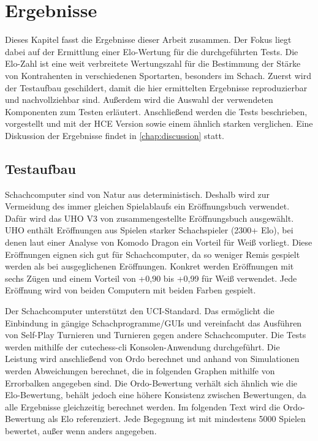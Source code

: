 \chapter{Ergebnisse}
\label{chap:Ergebnisse}

Dieses Kapitel fasst die Ergebnisse dieser Arbeit zusammen. Der Fokus liegt dabei auf der Ermittlung einer Elo-Wertung für die durchgeführten Tests. Die Elo-Zahl ist eine weit verbreitete Wertungszahl für die Bestimmung der Stärke von Kontrahenten in verschiedenen Sportarten, besonders im Schach. Zuerst wird der Testaufbau geschildert, damit die hier ermittelten Ergebnisse reproduzierbar und nachvollziehbar sind. Außerdem wird die Auswahl der verwendeten Komponenten zum Testen erläutert. Anschließend werden die Tests beschrieben, vorgestellt und mit der \ac{HCE} Version sowie einem ähnlich starken verglichen. Eine Diskussion der Ergebnisse findet in \autoref{chap:discussion} statt.

\section{Testaufbau}

Schachcomputer sind von Natur aus deterministisch. Deshalb wird zur Vermeidung des immer gleichen Spielablaufs ein Eröffnungsbuch verwendet. Dafür wird das \ac{UHO} V3 von \citeauthor{Pohl2021} \cite{Pohl2021} zusammengestellte Eröffnungsbuch ausgewählt. \ac{UHO} enthält Eröffnungen aus Spielen starker Schachspieler (2300+ Elo), bei denen laut einer Analyse von Komodo Dragon \cite{KomodoDragon} ein Vorteil für Weiß vorliegt. Diese Eröffnungen eignen sich gut für Schachcomputer, da so weniger Remis gespielt werden als bei ausgeglichenen Eröffnungen. Konkret werden Eröffnungen mit sechs Zügen und einem Vorteil von +0,90 bis +0,99 für Weiß verwendet. Jede Eröffnung wird von beiden Computern mit beiden Farben gespielt.

Der Schachcomputer unterstützt den \ac{UCI}-Standard. Das ermöglicht die Einbindung in gängige Schachprogramme/GUIs und vereinfacht das Ausführen von Self-Play Turnieren und Turnieren gegen andere Schachcomputer. Die Tests werden mithilfe der cutechess-cli \cite{CutechessRepo} Konsolen-Anwendung durchgeführt. Die Leistung wird anschließend von Ordo \cite{OrdoRepo} berechnet und anhand von Simulationen werden Abweichungen berechnet, die in folgenden Graphen mithilfe von Errorbalken angegeben sind. Die Ordo-Bewertung verhält sich ähnlich wie die Elo-Bewertung, behält jedoch eine höhere Konsistenz zwischen Bewertungen, da alle Ergebnisse gleichzeitig berechnet werden. Im folgenden Text wird die Ordo-Bewertung als Elo referenziert. Jede Begegnung ist mit mindestens 5000 Spielen bewertet, außer wenn anders angegeben.

